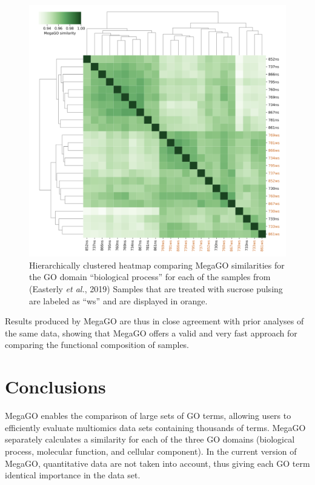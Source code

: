 \begin{figure}
\centering
\includegraphics{resources/figures/chapter4_megago_heatmap_example.png}
\caption{Hierarchically clustered heatmap comparing MegaGO similarities
for the GO domain ``biological process'' for each of the samples from
(Easterly \emph{et al.}, 2019) Samples that are treated with sucrose
pulsing are labeled as ``ws'' and are displayed in
orange.\label{fig:megago_heatmap}}
\end{figure}

Results produced by MegaGO are thus in close agreement with prior
analyses of the same data, showing that MegaGO offers a valid and very
fast approach for comparing the functional composition of samples.

\hypertarget{conclusions}{%
\section{Conclusions}\label{conclusions}}

MegaGO enables the comparison of large sets of GO terms, allowing users
to efficiently evaluate multiomics data sets containing thousands of
terms. MegaGO separately calculates a similarity for each of the three
GO domains (biological process, molecular function, and cellular
component). In the current version of MegaGO, quantitative data are not
taken into account, thus giving each GO term identical importance in the
data set.


